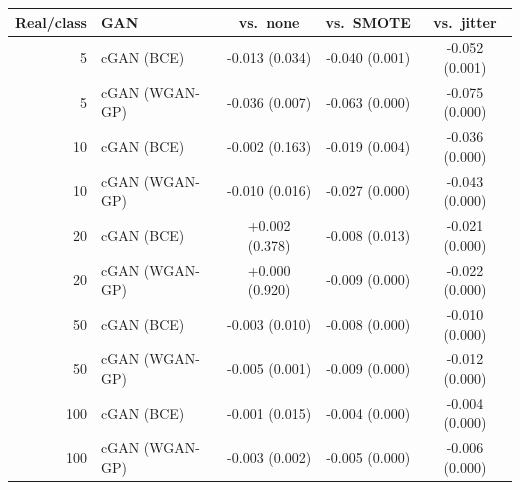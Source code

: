 \begin{tabular}{rlccc}
\toprule
\textbf{Real/class} & \textbf{GAN} & \textbf{vs.\ none} & \textbf{vs.\ SMOTE} & \textbf{vs.\ jitter}\\
\midrule
5 & cGAN (BCE) & -0.013 (0.034) & -0.040 (0.001) & -0.052 (0.001)\\
5 & cGAN (WGAN-GP) & -0.036 (0.007) & -0.063 (0.000) & -0.075 (0.000)\\
10 & cGAN (BCE) & -0.002 (0.163) & -0.019 (0.004) & -0.036 (0.000)\\
10 & cGAN (WGAN-GP) & -0.010 (0.016) & -0.027 (0.000) & -0.043 (0.000)\\
20 & cGAN (BCE) & +0.002 (0.378) & -0.008 (0.013) & -0.021 (0.000)\\
20 & cGAN (WGAN-GP) & +0.000 (0.920) & -0.009 (0.000) & -0.022 (0.000)\\
50 & cGAN (BCE) & -0.003 (0.010) & -0.008 (0.000) & -0.010 (0.000)\\
50 & cGAN (WGAN-GP) & -0.005 (0.001) & -0.009 (0.000) & -0.012 (0.000)\\
100 & cGAN (BCE) & -0.001 (0.015) & -0.004 (0.000) & -0.004 (0.000)\\
100 & cGAN (WGAN-GP) & -0.003 (0.002) & -0.005 (0.000) & -0.006 (0.000)\\\bottomrule
\end{tabular}
